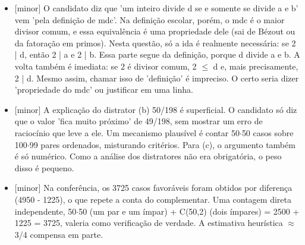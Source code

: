 \documentclass{article}%
\begin{document}
\begin{itemize}%
\item%
{[}minor{]} O candidato diz que 'um inteiro divide d se e somente se divide a e b' vem 'pela definição de mdc'. Na definição escolar, porém, o mdc é o maior divisor comum, e essa equivalência é uma propriedade dele (sai de Bézout ou da fatoração em primos). Nesta questão, só a ida é realmente necessária: se 2 | d, então 2 | a e 2 | b. Essa parte segue da definição, porque d divide a e b. A volta também é imediata: se 2 é divisor comum, 2 $\leq$ d e, mais precisamente, 2 | d. Mesmo assim, chamar isso de 'definição' é impreciso. O certo seria dizer 'propriedade do mdc' ou justificar em uma linha.%
\item%
{[}minor{]} A explicação do distrator (b) 50/198 é superficial. O candidato só diz que o valor 'fica muito próximo' de 49/198, sem mostrar um erro de raciocínio que leve a ele. Um mecanismo plausível é contar 50$\cdot$50 casos sobre 100$\cdot$99 pares ordenados, misturando critérios. Para (c), o argumento também é só numérico. Como a análise dos distratores não era obrigatória, o peso disso é pequeno.%
\item%
{[}minor{]} Na conferência, os 3725 casos favoráveis foram obtidos por diferença (4950 - 1225), o que repete a conta do complementar. Uma contagem direta independente, 50$\cdot$50 (um par e um ímpar) + C(50,2) (dois ímpares) = 2500 + 1225 = 3725, valeria como verificação de verdade. A estimativa heurística $\approx$ 3/4 compensa em parte.%
\end{itemize}%
\end{document}
